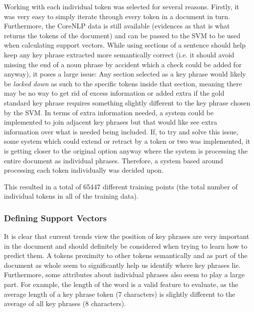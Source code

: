 Working with each individual token was selected for several reasons. Firstly, it was very easy to simply iterate through every token in a document in turn. Furthermore, the CoreNLP data is still available (evidences as that is what returns the tokens of the document) and can be passed to the SVM to be used when calculating support vectors. While using sections of a sentence should help keep any key phrase extracted more semantically correct (i.e. it should avoid missing the end of a noun phrase by accident which a check could be added for anyway), it poses a large issue: Any section selected as a key phrase would likely be \textit{locked down} as such to the specific tokens inside that section, meaning there may be no way to get rid of excess information or added extra if the gold standard key phrase requires something slightly different to the key phrase chosen by the SVM. In terms of extra information needed, a system could be implemented to join adjacent key phrases but that would like see extra information over what is needed being included. If, to try and solve this issue, some system which could extend or retract by a token or two was implemented, it is getting closer to the original option anyway where the system is processing the entire document as individual phrases. Therefore, a system based around processing each token individually was decided upon.

This resulted in a total of 65447 different training points (the total number of individual tokens in all of the training data).

\subsubsection*{Defining Support Vectors}
It is clear that current trends view the position of key phrases are very important in the document and should definitely be considered when trying to learn how to predict them. A tokens proximity to other tokens semantically and as part of the document as whole seem to significantly help us identify where key phrases lie. Furthermore, some attributes about individual phrases also seem to play a large part. For example, the length of the word is a valid feature to evaluate, as the average length of a key phrase token (7 characters) is slightly different to the average of all key phrases (8 characters). 

